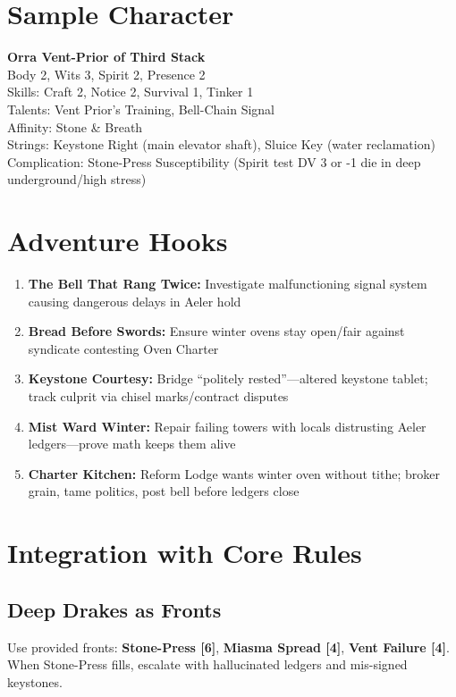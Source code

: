 \documentclass[11pt]{book}
\begin{document}
\section{Sample Character}
\textbf{Orra Vent-Prior of Third Stack} \\
Body 2, Wits 3, Spirit 2, Presence 2 \\
Skills: Craft 2, Notice 2, Survival 1, Tinker 1 \\
Talents: Vent Prior's Training, Bell-Chain Signal \\
Affinity: Stone \& Breath \\
Strings: Keystone Right (main elevator shaft), Sluice Key (water reclamation) \\
Complication: Stone-Press Susceptibility (Spirit test DV 3 or -1 die in deep underground/high stress)

\section{Adventure Hooks}
\begin{enumerate}
    \item \textbf{The Bell That Rang Twice:} Investigate malfunctioning signal system causing dangerous delays in Aeler hold
    \item \textbf{Bread Before Swords:} Ensure winter ovens stay open/fair against syndicate contesting Oven Charter
    \item \textbf{Keystone Courtesy:} Bridge ``politely rested''---altered keystone tablet; track culprit via chisel marks/contract disputes
    \item \textbf{Mist Ward Winter:} Repair failing towers with locals distrusting Aeler ledgers---prove math keeps them alive
    \item \textbf{Charter Kitchen:} Reform Lodge wants winter oven without tithe; broker grain, tame politics, post bell before ledgers close
\end{enumerate}

\section{Integration with Core Rules}
\subsection*{Deep Drakes as Fronts}
Use provided fronts: \textbf{Stone-Press [6]}, \textbf{Miasma Spread [4]}, \textbf{Vent Failure [4]}. When Stone-Press fills, escalate with hallucinated ledgers and mis-signed keystones.
\end{document}
